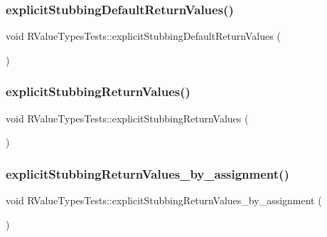 \subsubsection{\texorpdfstring{explicitStubbingDefaultReturnValues()}{explicitStubbingDefaultReturnValues()}}
{\footnotesize\ttfamily void R\+Value\+Types\+Tests\+::explicit\+Stubbing\+Default\+Return\+Values (\begin{DoxyParamCaption}{ }\end{DoxyParamCaption})\hspace{0.3cm}{\ttfamily [inline]}}

\mbox{\label{structRValueTypesTests_a5800f9a28f79309e17e417ace620933d}} 
\subsubsection{\texorpdfstring{explicitStubbingReturnValues()}{explicitStubbingReturnValues()}}
{\footnotesize\ttfamily void R\+Value\+Types\+Tests\+::explicit\+Stubbing\+Return\+Values (\begin{DoxyParamCaption}{ }\end{DoxyParamCaption})\hspace{0.3cm}{\ttfamily [inline]}}

\mbox{\label{structRValueTypesTests_ac97aa72227c7496652adc5befd6582c8}} 
\subsubsection{\texorpdfstring{explicitStubbingReturnValues\_by\_assignment()}{explicitStubbingReturnValues\_by\_assignment()}}
{\footnotesize\ttfamily void R\+Value\+Types\+Tests\+::explicit\+Stubbing\+Return\+Values\+\_\+by\+\_\+assignment (\begin{DoxyParamCaption}{ }\end{DoxyParamCaption})\hspace{0.3cm}{\ttfamily [inline]}}

